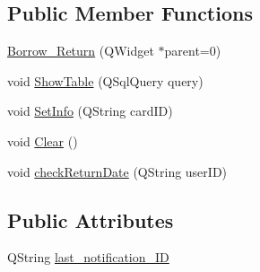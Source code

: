 \subsection*{Public Member Functions}
\begin{DoxyCompactItemize}
\item 
\mbox{\hyperlink{class_borrow___return_a60ee7fbb6b774305fbd655bd362572c5}{Borrow\+\_\+\+Return}} (Q\+Widget $\ast$parent=0)
\item 
void \mbox{\hyperlink{class_borrow___return_a061bb2484dacfe92218acb7d6e9494e5}{Show\+Table}} (Q\+Sql\+Query query)
\item 
void \mbox{\hyperlink{class_borrow___return_afd3bfd00077c0704c8b26f8e4254e176}{Set\+Info}} (Q\+String card\+ID)
\item 
void \mbox{\hyperlink{class_borrow___return_a65b8b7b7c224f0747c4330fb9aa6fdce}{Clear}} ()
\item 
void \mbox{\hyperlink{class_borrow___return_a1a2d49b2df8463373e60506f77005e64}{check\+Return\+Date}} (Q\+String user\+ID)
\end{DoxyCompactItemize}
\subsection*{Public Attributes}
\begin{DoxyCompactItemize}
\item 
Q\+String \mbox{\hyperlink{class_borrow___return_ab0439e8a8c1c061b43bc4e57d8a4a491}{last\+\_\+notification\+\_\+\+ID}}
\end{DoxyCompactItemize}
